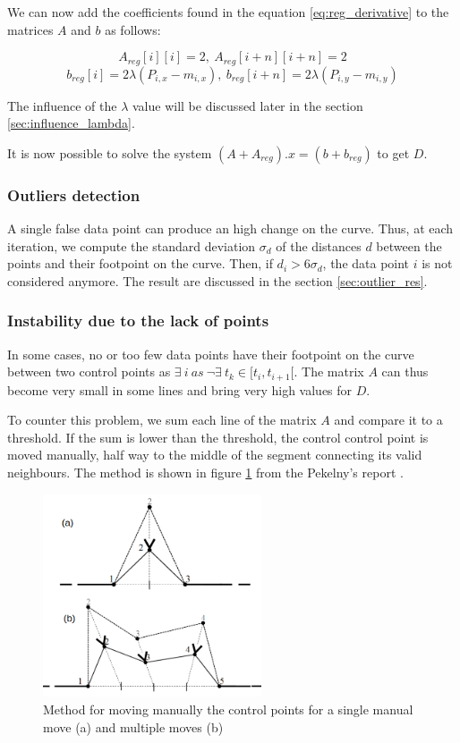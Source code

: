 \documentclass{article}
\newcommand{\vsp}{\vspace{\baselineskip}}
\begin{document}
We can now add the coefficients found in the equation \ref{eq:reg_derivative} to the matrices $A$ and $b$ as follows:

$$ A_{reg}[i][i] = 2,\ A_{reg}[i+n][i+n] = 2 $$
$$ b_{reg}[i] = 2\lambda (P_{i,x} - m_{i,x}),\ b_{reg}[i+n] = 2\lambda (P_{i,y} - m_{i,y})$$

The influence of the $\lambda$ value will be discussed later in the section \ref{sec:influence_lambda}. 

\vsp

It is now possible to solve the system $(A+A_{reg}).x=(b+b_{reg})$ to get $D$.

\subsubsection{Outliers detection}

A single false data point can produce an high change on the curve. Thus, at each iteration, we compute the standard deviation $\sigma_d$ of the distances $d$ between the points and their footpoint on the curve. Then, if $d_i > 6 \sigma_d$, the data point $i$ is not considered anymore. The result are discussed in the section \ref{sec:outlier_res}.


\subsubsection{Instability due to the lack of points}

In some cases, no or too few data points have their footpoint on the curve between two control points as $\exists\ i\ as\ \neg\exists\ t_k \in [t_i,t_{i+1}[ $. The matrix $A$ can thus become very small in some lines and bring very high values for $D$.

\vsp

To counter this problem, we sum each line of the matrix $A$ and compare it to a threshold. If the sum is lower than the threshold, the control control point is moved manually, half way to the middle of the segment connecting its valid neighbours. The method is shown in figure \ref{fig:manual_move_ctrl_pts} from the Pekelny's report \cite{pekelny_bsp}.

\begin{figure}[H]
    \centering
    \includegraphics[height = 6cm]{images/manual_move_ctrl_pts.png}
    \caption[Method for moving manually the control points]{Method for moving manually the control points for a single manual move (a) and multiple moves (b)}
    \label{fig:manual_move_ctrl_pts}
\end{figure}
\end{document}
